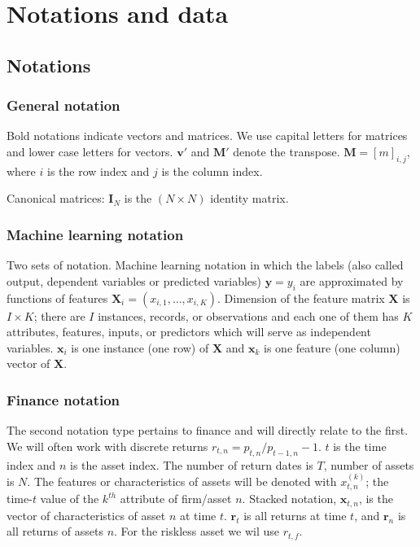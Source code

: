 \section{Notations and data}

\subsection{Notations}

\subsubsection{General notation}
Bold notations indicate vectors and matrices. We use capital letters for matrices and lower case letters for vectors. $\mathbf{v}'$ and $\mathbf{M}'$ denote the transpose. $\mathbf{M} = [m]_{i,j}$, where $i$ is the row index and $j$ is the column index.

Canonical matrices: $\mathbf{I}_{N}$ is the $(N \times N)$ identity matrix.

\subsubsection{Machine learning notation}
Two sets of notation. Machine learning notation in which the labels (also called output, dependent variables or predicted variables) $\mathbf{y} = y_{i}$ are approximated by functions of features $\mathbf{X}_{i}=(x_{i,1},\ldots,x_{i,K})$. Dimension of the feature matrix $\mathbf{X}$ is $I \times K$;  there are 
$I$ instances, records, or observations and each one of them has $K$ attributes, features, inputs, or predictors which will serve as independent variables. $\mathbf{x}_{i}$ is one instance (one row) of $\mathbf{X}$ and $\mathbf{x}_{k}$ is one feature (one column) vector of $\mathbf{X}$.

\subsubsection{Finance notation}
The second notation type pertains to finance and will directly relate to the first. We will often work with discrete returns $r_{t,n} = p_{t,n}/p_{t-1,n} - 1$. $t$ is the time index and $n$ is the asset index. The number of return dates is $T$, number of assets is $N$. The features or characteristics of assets will be denoted with $x_{t,n}^{(k)}$; the time-$t$ value of the $k^{th}$ attribute of firm/asset $n$. Stacked notation, $\mathbf{x}_{t,n}$, is the vector of characteristics of asset $n$ at time $t$. $\mathbf{r}_{t}$ is all returns at time $t$, and $\mathbf{r}_{n}$ is all returns of assets $n$. For the riskless asset we wil use $r_{t,f}$.

